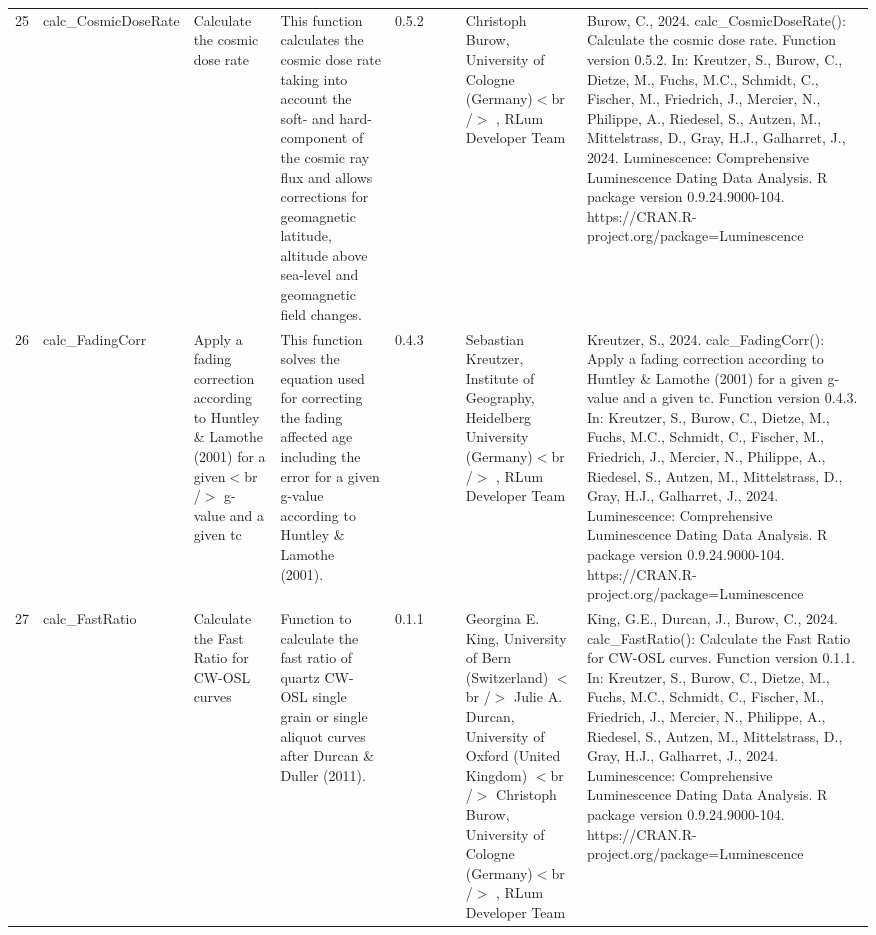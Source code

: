 \begin{table}[ht]
\begin{tabular}{rllllllll}
 \\ 
  25 & calc\_CosmicDoseRate & Calculate the cosmic dose rate & This function calculates the cosmic dose rate taking into account the soft- and hard-component of the cosmic ray flux and allows corrections for geomagnetic latitude, altitude above sea-level and geomagnetic field changes. & 0.5.2
 &  &  & Christoph Burow, University of Cologne (Germany)$<$br /$>$ , RLum Developer Team & Burow, C., 2024. calc\_CosmicDoseRate(): Calculate the cosmic dose rate. Function version 0.5.2. In: Kreutzer, S., Burow, C., Dietze, M., Fuchs, M.C., Schmidt, C., Fischer, M., Friedrich, J., Mercier, N., Philippe, A., Riedesel, S., Autzen, M., Mittelstrass, D., Gray, H.J., Galharret, J., 2024. Luminescence: Comprehensive Luminescence Dating Data Analysis. R package version 0.9.24.9000-104. https://CRAN.R-project.org/package=Luminescence
 \\ 
  26 & calc\_FadingCorr & Apply a fading correction according to Huntley \& Lamothe (2001) for a given$<$br /$>$ g-value and a given tc & This function solves the equation used for correcting the fading affected age including the error for a given g-value according to Huntley \& Lamothe (2001). & 0.4.3
 &  &  & Sebastian Kreutzer, Institute of Geography, Heidelberg University (Germany)$<$br /$>$ , RLum Developer Team & Kreutzer, S., 2024. calc\_FadingCorr(): Apply a fading correction according to Huntley \& Lamothe (2001) for a given g-value and a given tc. Function version 0.4.3. In: Kreutzer, S., Burow, C., Dietze, M., Fuchs, M.C., Schmidt, C., Fischer, M., Friedrich, J., Mercier, N., Philippe, A., Riedesel, S., Autzen, M., Mittelstrass, D., Gray, H.J., Galharret, J., 2024. Luminescence: Comprehensive Luminescence Dating Data Analysis. R package version 0.9.24.9000-104. https://CRAN.R-project.org/package=Luminescence
 \\ 
  27 & calc\_FastRatio & Calculate the Fast Ratio for CW-OSL curves & Function to calculate the fast ratio of quartz CW-OSL single grain or single aliquot curves after Durcan \& Duller (2011). & 0.1.1
 &  &  & Georgina E. King, University of Bern (Switzerland)  $<$br /$>$ Julie A. Durcan, University of Oxford (United Kingdom)  $<$br /$>$ Christoph Burow, University of Cologne (Germany)$<$br /$>$ , RLum Developer Team & King, G.E., Durcan, J., Burow, C., 2024. calc\_FastRatio(): Calculate the Fast Ratio for CW-OSL curves. Function version 0.1.1. In: Kreutzer, S., Burow, C., Dietze, M., Fuchs, M.C., Schmidt, C., Fischer, M., Friedrich, J., Mercier, N., Philippe, A., Riedesel, S., Autzen, M., Mittelstrass, D., Gray, H.J., Galharret, J., 2024. Luminescence: Comprehensive Luminescence Dating Data Analysis. R package version 0.9.24.9000-104. https://CRAN.R-project.org/package=Luminescence

\end{tabular}
\end{table}

